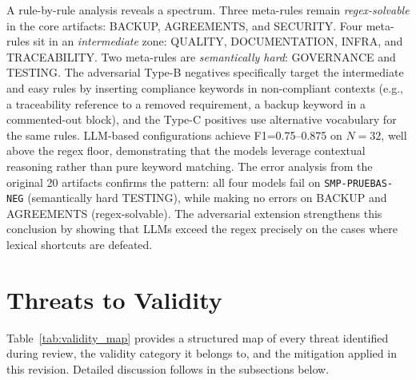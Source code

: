 \documentclass{ieeeaccess}
\begin{document}
A rule-by-rule analysis reveals a spectrum. Three meta-rules remain \emph{regex-solvable} in the core artifacts: BACKUP, AGREEMENTS, and SECURITY. Four meta-rules sit in an \emph{intermediate} zone: QUALITY, DOCUMENTATION, INFRA, and TRACEABILITY. Two meta-rules are \emph{semantically hard}: GOVERNANCE and TESTING. The adversarial Type-B negatives specifically target the intermediate and easy rules by inserting compliance keywords in non-compliant contexts (e.g., a traceability reference to a removed requirement, a backup keyword in a commented-out block), and the Type-C positives use alternative vocabulary for the same rules. LLM-based configurations achieve F1=0.75--0.875 on $N=32$, well above the regex floor, demonstrating that the models leverage contextual reasoning rather than pure keyword matching. The error analysis from the original 20 artifacts confirms the pattern: all four models fail on \texttt{SMP-PRUEBAS-NEG} (semantically hard TESTING), while making no errors on BACKUP and AGREEMENTS (regex-solvable). The adversarial extension strengthens this conclusion by showing that LLMs exceed the regex precisely on the cases where lexical shortcuts are defeated.


\section{Threats to Validity}
\label{sec:threats}

Table~\ref{tab:validity_map} provides a structured map of every threat identified during review, the validity category it belongs to, and the mitigation applied in this revision. Detailed discussion follows in the subsections below.
\end{document}
